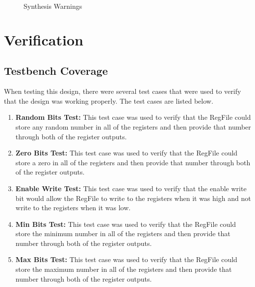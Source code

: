 \documentclass[
    a4paper, %
	12pt, %
    ]{CSSullivanBusinessReport}
\begin{document}
\begin{fullwidth}
\begin{figure}[H]
    \captionsetup{style=widetable}
    \caption{Synthesis Warnings}
    \label{fig:SynthesisWarnings}
\end{figure}

\section{Verification} %

\subsection{Testbench Coverage} %

When testing this design, there were several test cases that were used to verify that the design was working properly. The test cases are listed below.

\begin{enumerate}
    \item \textbf{Random Bits Test:} This test case was used to verify that the RegFile could store any random number in all of the registers and then provide that number through both of the register outputs.
    \item \textbf{Zero Bits Test:} This test case was used to verify that the RegFile could store a zero in all of the registers and then provide that number through both of the register outputs.
    \item \textbf{Enable Write Test:} This test case was used to verify that the enable write bit would allow the RegFile to write to the registers when it was high and not write to the registers when it was low.
    \item \textbf{Min Bits Test:} This test case was used to verify that the RegFile could store the minimum number in all of the registers and then provide that number through both of the register outputs.
    \item \textbf{Max Bits Test:} This test case was used to verify that the RegFile could store the maximum number in all of the registers and then provide that number through both of the register outputs.
\end{enumerate}


\end{fullwidth}
\end{document}
